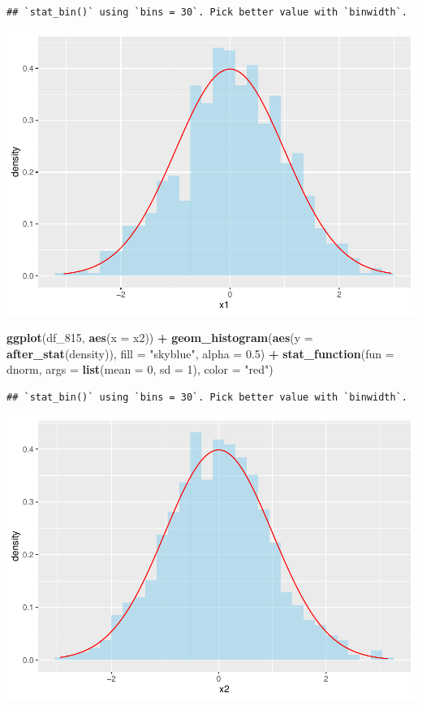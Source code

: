 \documentclass[
]{article}
\newenvironment{Shaded}{\begin{snugshade}}{\end{snugshade}}
\newcommand{\AttributeTok}[1]{\textcolor[rgb]{0.13,0.29,0.53}{#1}}
\newcommand{\DecValTok}[1]{\textcolor[rgb]{0.00,0.00,0.81}{#1}}
\newcommand{\FloatTok}[1]{\textcolor[rgb]{0.00,0.00,0.81}{#1}}
\newcommand{\FunctionTok}[1]{\textcolor[rgb]{0.13,0.29,0.53}{\textbf{#1}}}
\newcommand{\NormalTok}[1]{#1}
\newcommand{\SpecialCharTok}[1]{\textcolor[rgb]{0.81,0.36,0.00}{\textbf{#1}}}
\newcommand{\StringTok}[1]{\textcolor[rgb]{0.31,0.60,0.02}{#1}}
\begin{document}
\begin{verbatim}
## `stat_bin()` using `bins = 30`. Pick better value with `binwidth`.
\end{verbatim}

\includegraphics{Bayes_stat_hw2_files/figure-latex/unnamed-chunk-22-1.pdf}

\begin{Shaded}
\begin{Highlighting}[]
\FunctionTok{ggplot}\NormalTok{(df\_815, }\FunctionTok{aes}\NormalTok{(}\AttributeTok{x =}\NormalTok{ x2)) }\SpecialCharTok{+}
  \FunctionTok{geom\_histogram}\NormalTok{(}\FunctionTok{aes}\NormalTok{(}\AttributeTok{y =} \FunctionTok{after\_stat}\NormalTok{(density)), }\AttributeTok{fill =} \StringTok{"skyblue"}\NormalTok{, }\AttributeTok{alpha =} \FloatTok{0.5}\NormalTok{) }\SpecialCharTok{+}
  \FunctionTok{stat\_function}\NormalTok{(}\AttributeTok{fun =}\NormalTok{ dnorm, }\AttributeTok{args =} \FunctionTok{list}\NormalTok{(}\AttributeTok{mean =} \DecValTok{0}\NormalTok{, }\AttributeTok{sd =} \DecValTok{1}\NormalTok{), }\AttributeTok{color =} \StringTok{"red"}\NormalTok{) }
\end{Highlighting}
\end{Shaded}

\begin{verbatim}
## `stat_bin()` using `bins = 30`. Pick better value with `binwidth`.
\end{verbatim}

\includegraphics{Bayes_stat_hw2_files/figure-latex/unnamed-chunk-23-1.pdf}
\end{document}
